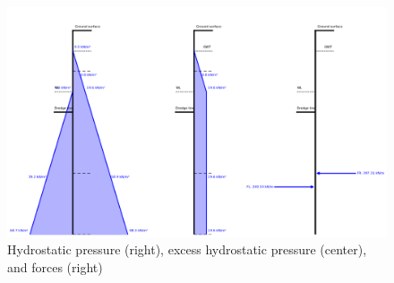 \begin{figure}[H]
    \centering
    \includegraphics[width=0.90\linewidth]{figures/ch8/water_overview.png}
    \caption{Hydrostatic pressure (right), excess hydrostatic pressure (center), and forces (right)}
    \label{fig:hydrostatic_excess_pressure}
\end{figure}




